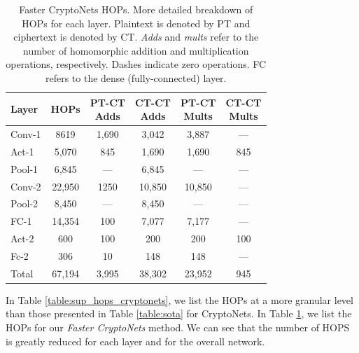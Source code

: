 \documentclass[conference]{IEEEtran}
\begin{document}
\begin{table}[!htbp]
    \centering
    \small
    \begin{tabular}{@{}l|c|c|c|c|c@{}}
    \toprule
    Layer & HOPs & \pbox{20cm}{PT-CT \\ Adds} & \pbox{20cm}{CT-CT \\ Adds} & \pbox{20cm}{PT-CT \\ Mults} & \pbox{20cm}{CT-CT \\ Mults} \\ \midrule
    Conv-1 & 8619 & 1,690 & 3,042 & 3,887 & --- \\ 
    Act-1 & 5,070 & 845 & 1,690 & 1,690 & 845 \\ 
    Pool-1 & 6,845 & --- & 6,845 & --- & --- \\ 
    Conv-2 & 22,950 & 1250 & 10,850 & 10,850 & --- \\ 
    Pool-2 & 8,450 & --- & 8,450 & --- & --- \\ 
    FC-1 & 14,354 & 100 & 7,077 & 7,177 & --- \\ 
    Act-2 & 600 & 100 & 200 & 200 & 100 \\ 
    Fc-2 & 306 & 10 & 148 & 148 & --- \\  \midrule
    Total & 67,194 & 3,995 & 38,302 & 23,952 & 945 \\ \bottomrule
    \end{tabular}
    \caption{Faster CryptoNets HOPs. More detailed breakdown of HOPs for each layer. Plaintext is denoted by PT and ciphertext is denoted by CT. \textit{Adds} and \textit{mults} refer to the number of homomorphic addition and multiplication operations, respectively. Dashes indicate zero operations. FC refers to the dense (fully-connected) layer.}
        \label{table:sup_hops_fastcryptonets}
\end{table}

In Table \ref{table:sup_hops_cryptonets}, we list the HOPs at a more granular level than those presented in Table \ref{table:sota} for CryptoNets.  In Table \ref{table:sup_hops_fastcryptonets}, we list the HOPs for our \textit{Faster CryptoNets} method.  We can see that the number of HOPS is greatly reduced for each layer and for the overall network.

\end{document}
